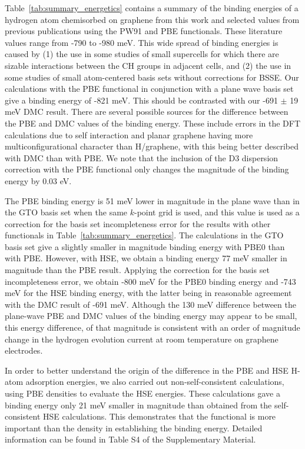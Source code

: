 Table~\ref{tab:summary_energetics} contains a summary of the binding energies of a hydrogen atom chemisorbed on graphene from this work and selected values from previous publications using the PW91 and PBE functionals.
These literature values range from -790 to -980 meV.
This wide spread of binding energies is caused by (1) the use in some studies of small supercells for which there are sizable interactions between the CH groups in adjacent cells, and (2) the use in some studies of small atom-centered basis sets without corrections for BSSE.
Our calculations with the PBE functional in conjunction with a plane wave basis set give a binding energy of -821 meV. 
This should be contrasted with our -691 $\pm$ 19 meV DMC result.
There are several possible sources for the difference between the PBE and DMC values of the binding energy. 
These include errors in the DFT calculations due to self interaction and planar graphene having more multiconfigurational character than H/graphene, with this being better described with DMC than with PBE.
We note that the inclusion of the D3 dispersion correction with the PBE functional only changes the magnitude of the binding energy by 0.03 eV.

The PBE binding energy is 51 meV lower in magnitude in the plane wave than in the GTO basis set when the same $k$-point grid is used, and this value is used as a correction for the basis set incompleteness error for the results with other functionals in Table~\ref{tab:summary_energetics}.
The calculations in the GTO basis set give a slightly smaller in magnitude binding energy with PBE0 than with PBE.
However, with HSE, we obtain a binding energy 77 meV smaller in magnitude than the PBE result.
Applying the correction for the basis set incompleteness error, we obtain -800 meV for the PBE0 binding energy and -743 meV for the HSE binding energy, with the latter being in reasonable agreement with the DMC result of -691 meV.
Although the 130 meV difference between the plane-wave PBE and DMC values of the binding energy may appear to be small, this energy difference, of that magnitude is consistent with an order of magnitude change in the hydrogen evolution current at room temperature on graphene electrodes.\cite{doi:10.1021/acsami.1c21821}


 
In order to better understand the origin of the difference in the PBE and HSE H-atom adsorption energies, we also carried out non-self-consistent calculations, using PBE densities to evaluate the HSE energies.  These calculations gave a binding energy only 21 meV smaller in magnitude than obtained from the self-consistent HSE calculations.  This demonstrates that the functional is more important than the density in establishing the binding energy. Detailed information can be found in Table S4 of the Supplementary Material.
 
